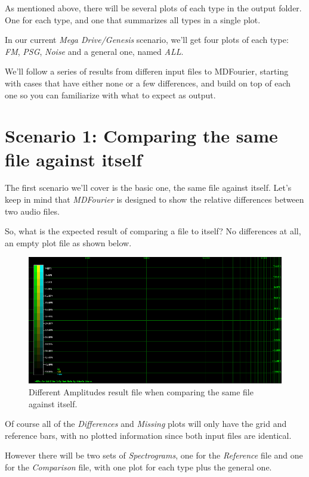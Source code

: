 \documentclass[10pt,a4paper]{report}
\begin{document}
As mentioned above, there will be several plots of each type in the output folder. One for each type, and one that summarizes all types in a single plot.

In our current\textit{ Mega Drive/Genesis} scenario, we'll get four plots of each type: \textit{FM}, \textit{PSG}, \textit{Noise} and a general one, named \textit{ALL}.

We'll follow a series of results from differen input files to MDFourier, starting with cases that have either none or a few differences, and build on top of each one so you can familiarize with what to expect as output.

\section{Scenario 1: Comparing the same file against itself}

The first scenario we'll cover is the basic one, the same file against itself. Let's keep in mind that \textit{MDFourier} is designed to show the relative differences between two audio files.

So, what is the expected result of comparing a file to itself? No differences at all, an empty plot file as shown below.

\begin{figure}[H]
	\centering
	\includegraphics[width=1.0\linewidth]{plots/Plot1-SameFile.png}
	\caption[Same file compared]{Different Amplitudes result file when comparing the same file against itself.}
	\label{fig:plot1-samefile}
\end{figure}

Of course all of the \textit{Differences} and \textit{Missing} plots will only have the grid and reference bars, with no plotted information since both input files are identical. 

However there will be two sets of \textit{Spectrograms}, one for the \textit{Reference} file and one for the \textit{Comparison} file, with one plot for each type plus the general one.
\end{document}
